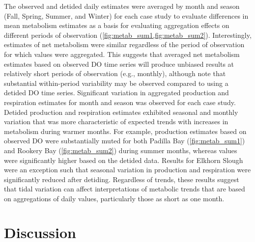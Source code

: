 \documentclass[letterpaper,12pt,oneside]{article}\usepackage[]{graphicx}\usepackage[]{color}
\begin{document}
The observed and detided daily estimates were averaged by month and season (Fall, Spring, Summer, and Winter) for each case study to evaluate differences in mean metabolism estimates as a basis for evaluating aggregation effects on different periods of observation (\cref{fig:metab_sum1,fig:metab_sum2}).  Interestingly, estimates of net metabolism were similar regardless of the period of observation for which values were aggregated.  This suggests that averaged net metabolism estimates based on observed \ac{DO} time series will produce unbiased results at relatively short periods of observation (e.g., monthly), although note that substantial within-period variability may be observed compared to using a detided \ac{DO} time series.  Significant variation in aggregated production and respiration estimates for month and season was observed for each case study.  Detided production and respiration estimates exhibited seasonal and monthly variation that was more characteristic of expected trends with increases in metabolism during warmer months.  For example, production estimates based on observed \ac{DO} were substantially muted for both Padilla Bay (\cref{fig:metab_sum1}) and Rookery Bay (\cref{fig:metab_sum2}) during summer months, whereas values were significantly higher based on the detided data. Results for Elkhorn Slough were an exception such that seasonal variation in production and respiration were significantly reduced after detiding.  Regardless of trends, these results suggest that tidal variation can affect interpretations of metabolic trends that are based on aggregations of daily values, particularly those as short as one month.      

 

\section{Discussion}
\end{document}
